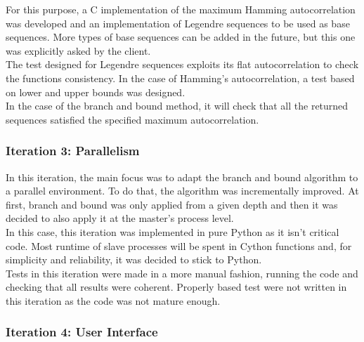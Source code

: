       For this purpose, a C implementation of the maximum Hamming
      autocorrelation was developed and an implementation of Legendre sequences
      to be used as base sequences. More types of base sequences can be added
      in the future, but this one was explicitly asked by the client.\\

      The test designed for Legendre sequences exploits its flat
      autocorrelation to check the functions consistency. In the case of
      Hamming's autocorrelation, a test based on lower and upper
      bounds was designed.\\

      In the case of the branch and bound method, it will check that all the
      returned sequences satisfied the specified maximum autocorrelation.\\

      \subsubsection{Iteration 3: Parallelism}

      In this iteration, the main focus was to adapt the branch and bound algorithm
      to a parallel environment. To do that, the algorithm was incrementally
      improved. At first, branch and bound was only applied from a given depth and
      then it was decided to also apply it at the master's process level.\\

      In this case, this iteration was implemented in pure Python as it isn't
      critical code. Most runtime of slave processes will be spent in Cython
      functions and, for simplicity and reliability, it was decided to stick to
      Python.\\

      Tests in this iteration were made in a more manual fashion, running the
      code and checking that all results were coherent. Properly based test were not written in this iteration as the code was not mature enough.\\



      \subsubsection{Iteration 4: User Interface}

